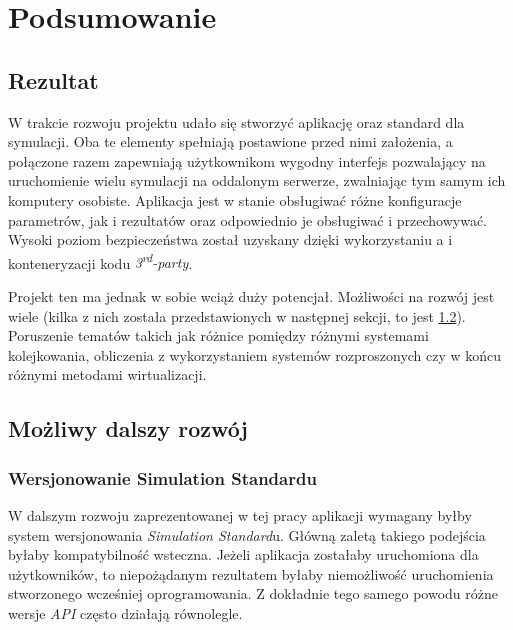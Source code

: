 \chapter{Podsumowanie}
\label{cha:podsumowanie}

\section{Rezultat}

\par W trakcie rozwoju projektu udało się stworzyć aplikację oraz standard dla symulacji. Oba te elementy spełniają postawione przed nimi założenia, a połączone razem zapewniają użytkownikom wygodny interfejs pozwalający na uruchomienie wielu symulacji na oddalonym serwerze, zwalniając tym samym ich komputery osobiste. Aplikacja jest w stanie obsługiwać różne konfiguracje parametrów, jak i rezultatów oraz odpowiednio je obsługiwać i przechowywać. Wysoki poziom bezpieczeństwa został uzyskany dzięki wykorzystaniu \emph{\docker}a i konteneryzacji kodu \emph{3\textsuperscript{rd}-party}.

\par Projekt ten ma jednak w sobie wciąż duży potencjał. Możliwości na rozwój jest wiele (kilka z nich została przedstawionych w następnej sekcji, to jest \ref{sec:mozliwyDalszyRozwoj}). Poruszenie tematów takich jak różnice pomiędzy różnymi systemami kolejkowania, obliczenia z wykorzystaniem systemów rozproszonych czy w końcu różnymi metodami wirtualizacji.

\section{Możliwy dalszy rozwój}
\label{sec:mozliwyDalszyRozwoj}

\subsection{Wersjonowanie Simulation Standardu}

\par W dalszym rozwoju zaprezentowanej w tej pracy aplikacji wymagany byłby system wersjonowania \emph{Simulation Standard}u. Główną zaletą takiego podejścia byłaby kompatybilność wsteczna. Jeżeli aplikacja zostałaby uruchomiona dla użytkowników, to niepożądanym rezultatem byłaby niemożliwość uruchomienia stworzonego wcześniej oprogramowania. Z dokładnie tego samego powodu różne wersje \emph{API} często działają równolegle.

